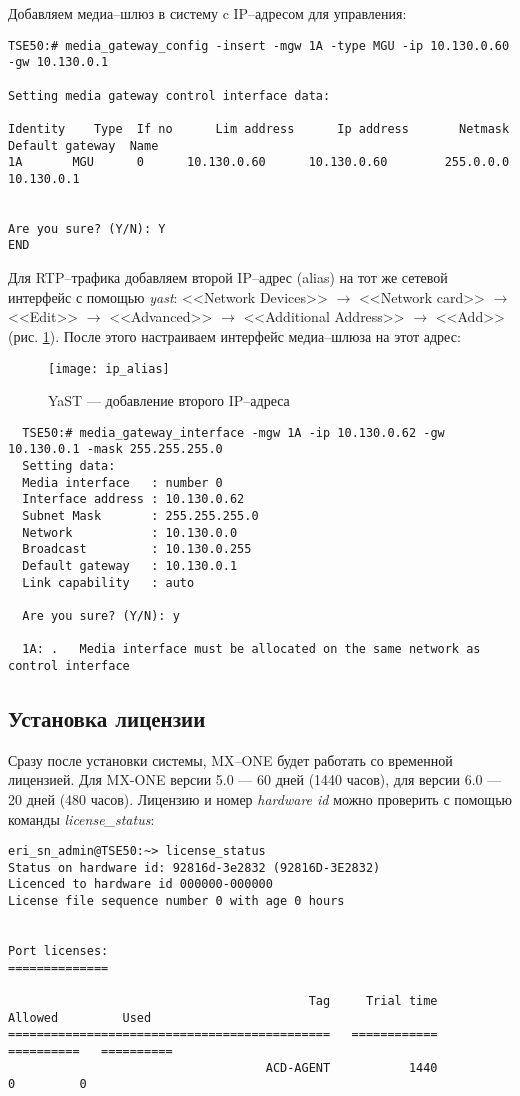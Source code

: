 Добавляем медиа--шлюз в систему c IP--адресом для управления:
\begin{lstlisting}
TSE50:# media_gateway_config -insert -mgw 1A -type MGU -ip 10.130.0.60 -gw 10.130.0.1

Setting media gateway control interface data:

Identity    Type  If no      Lim address      Ip address       Netmask      Default gateway  Name
1A       MGU      0      10.130.0.60      10.130.0.60        255.0.0.0       10.130.0.1


Are you sure? (Y/N): Y
END
\end{lstlisting}

Для RTP--трафика добавляем второй IP--адрес (alias) на тот же сетевой интерфейс с помощью {\em yast}: <<Network Devices>> $\rightarrow$ <<Network card>> $\rightarrow$ <<Edit>> $\rightarrow$ <<Advanced>> $\rightarrow$ <<Additional Address>> $\rightarrow$ <<Add>> (рис. \ref{img:ip_alias}). После этого настраиваем интерфейс медиа--шлюза на этот адрес:
\begin{figure}[!ht]
  \center
  \texttt{[image: ip\_alias]}
  \caption{YaST --- добавление второго IP--адреса}
  \label{img:ip_alias}
\end{figure}


\begin{lstlisting}
  TSE50:# media_gateway_interface -mgw 1A -ip 10.130.0.62 -gw 10.130.0.1 -mask 255.255.255.0
  Setting data:
  Media interface   : number 0
  Interface address : 10.130.0.62
  Subnet Mask       : 255.255.255.0
  Network           : 10.130.0.0
  Broadcast         : 10.130.0.255
  Default gateway   : 10.130.0.1
  Link capability   : auto

  Are you sure? (Y/N): y

  1A: .   Media interface must be allocated on the same network as control interface
\end{lstlisting}

\subsection{Установка лицензии}

Сразу после установки системы, MX--ONE будет работать со временной лицензией. Для MX-ONE версии 5.0 --- 60 дней (1440 часов), для версии 6.0 --- 20 дней (480 часов). Лицензию и номер {\em hardware id} можно проверить с помощью команды {\em license\_status}: 
\begin{lstlisting}
eri_sn_admin@TSE50:~> license_status
Status on hardware id: 92816d-3e2832 (92816D-3E2832)
Licenced to hardware id 000000-000000
License file sequence number 0 with age 0 hours


Port licenses:
==============

                                          Tag     Trial time      Allowed         Used
=============================================   ============   ==========   ==========
                                    ACD-AGENT           1440            0         0

\end{lstlisting}

